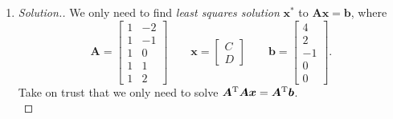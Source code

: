 \begin{enumerate}
\begin{proof}[Solution.]
\begin{itemize}
\begin{itemize}
\begin{align*}
\begin{pmatrix}
1\\2\\1
\end{pmatrix}
\end{align*}
\item
Then we convert orthogonal sets $\{\bm A,\bm B\}$ into orthonormal:
\[
\bm q_1:=\frac{\bm A}{\|\bm A\|}=\begin{pmatrix}
-\frac{2}{\sqrt{5}}\\\frac{1}{\sqrt{5}}\\0
\end{pmatrix}\qquad
\bm q_2:=\frac{\bm B}{\|\bm B\|}=\begin{pmatrix}
\frac{1}{\sqrt{6}}\\\frac{2}{\sqrt{6}}\\\frac{1}{\sqrt{6}}
\end{pmatrix}
\]
\end{itemize}
\end{itemize}
In conclusion, one orthonormal basis for $\bm U$ is $\left\{\begin{pmatrix}
-\frac{2}{\sqrt{5}}\\\frac{1}{\sqrt{5}}\\0
\end{pmatrix},\begin{pmatrix}
\frac{1}{\sqrt{6}}\\\frac{2}{\sqrt{6}}\\\frac{1}{\sqrt{6}}
\end{pmatrix}\right\}$.
\end{proof}
\item
\begin{proof}[Solution.] 
We only need to find \textit{least squares solution} $\bm x^*$ to $\bm{Ax}=\bm b$, where
\[
\bm A=\begin{bmatrix}
1&-2\\1&-1\\1&0\\1&1\\1&2
\end{bmatrix}\qquad\bm x=\begin{bmatrix}
C\\D
\end{bmatrix}\qquad\bm b=\begin{bmatrix}
4\\2\\-1\\0\\0
\end{bmatrix}.
\]
Take on trust that we only need to solve $\bm A^{\mathrm T}\bm A\bm x=\bm A^{\mathrm T}\bm b$.\\

\end{proof}
\end{enumerate}
